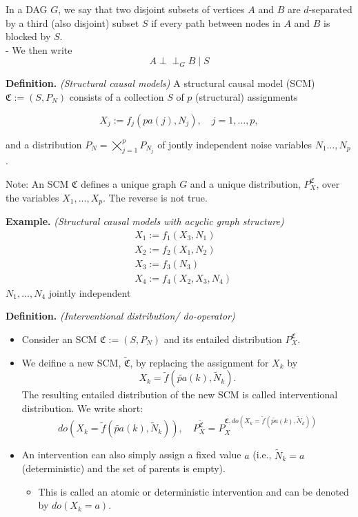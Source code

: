 \documentclass[
]{book}
\providecommand{\tightlist}{%
  \setlength{\itemsep}{0pt}\setlength{\parskip}{0pt}}
\begin{document}
In a DAG \(G\), we say that two disjoint subsets of vertices \(A\) and \(B\) are \(d\)-separated by a third (also disjoint) subset \(S\) if every path between nodes in \(A\) and \(B\) is blocked by \(S\).\\
- We then write
\[
    A \perp\!\!\!\!\perp_G B \mid S
    \]

\textbf{Definition.} \emph{(Structural causal models)} A structural causal model (SCM) \(\mathfrak{C}:=\left(S, P_N\right)\) consists of a collection \(S\) of \(p\) (structural) assignments

\[
X_j:=f_j\left(pa(j), N_j\right), \quad j=1, \ldots, p,
\]

and a distribution \(P_N=\bigtimes_{j=1}^p P_{N_j}\) of jontly independent noise variables \(N_1\dots,N_p\).

Note: An SCM \(\mathfrak{C}\) defines a unique graph \(G\) and a unique distribution, \(P^{\mathfrak{C}}_X\), over the variables \(X_1,...,X_p\). The reverse is not true.

\textbf{Example.} \emph{(Structural causal models with acyclic graph structure)}
\begin{align*}
& X_1:=f_1\left(X_3, N_1\right) \\
& X_2:=f_2\left(X_1, N_2\right) \\
& X_3:=f_3\left(N_3\right) \\
& X_4:=f_4\left(X_2, X_3, N_4\right)
\end{align*}
\(N_1, \ldots, N_4\) jointly independent

\textbf{Definition.} \emph{(Interventional distribution/ do-operator)}

\begin{itemize}
\item
  Consider an SCM \(\mathfrak C := (S,P_N)\) and its entailed distribution \(P^{\mathfrak C}_X\).
\item
  We deifine a new SCM, \(\tilde {\mathfrak C}\), by replacing the assignment for \(X_k\) by
  \[ 
  X_k = \tilde f(\tilde {pa}(k), \tilde N_k).
  \]
  The resulting entailed distribution of the new SCM is called interventional distribution.
  We write short:
  \[
  do(X_k = \tilde f(\tilde {pa}(k), \tilde N_k)), \quad P_X^{\tilde {\mathfrak C}}=P^{\mathfrak C, do(X_k = \tilde f(\tilde {pa}(k), \tilde N_k))}_X
  \]
\item
  An intervention can also simply assign a fixed value \(a\) (i.e., \(\tilde N_k=a\) (deterministic) and the set of parents is empty).

  \begin{itemize}
  \tightlist
  \item
    This is called an atomic or deterministic intervention and can be denoted by \(do(X_k = a)\).
  \end{itemize}
\end{itemize}
\end{document}
